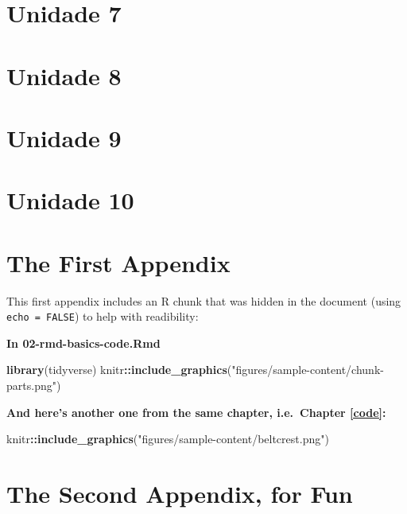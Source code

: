\documentclass[a4paper, twoside]{templates/ociamthesis}
\newenvironment{Shaded}{\begin{snugshade}}{\end{snugshade}}
\newcommand{\KeywordTok}[1]{\textcolor[rgb]{0.13,0.29,0.53}{\textbf{#1}}}
\newcommand{\NormalTok}[1]{#1}
\newcommand{\OperatorTok}[1]{\textcolor[rgb]{0.81,0.36,0.00}{\textbf{#1}}}
\newcommand{\StringTok}[1]{\textcolor[rgb]{0.31,0.60,0.02}{#1}}
\renewenvironment{Shaded}
{
  \vspace{10pt}%
  \begin{snugshade}%
}{%
  \end{snugshade}%
  \vspace{8pt}%
}
\newcommand*{\bibtitle}{Bibliografía}
\theoremstyle{definition}
\theoremstyle{definition}
\theoremstyle{definition}
\theoremstyle{definition}
\theoremstyle{remark}
\begin{document}
\hypertarget{unidade-7}{%
\chapter{Unidade 7}\label{unidade-7}}

\hypertarget{unidade-8}{%
\chapter{Unidade 8}\label{unidade-8}}

\hypertarget{unidade-9}{%
\chapter{Unidade 9}\label{unidade-9}}

\hypertarget{unidade-10}{%
\chapter{Unidade 10}\label{unidade-10}}

\startappendices

\hypertarget{the-first-appendix}{%
\chapter{The First Appendix}\label{the-first-appendix}}

This first appendix includes an R chunk that was hidden in the document (using \texttt{echo\ =\ FALSE}) to help with readibility:

\textbf{In 02-rmd-basics-code.Rmd}

\begin{Shaded}
\begin{Highlighting}[]
\KeywordTok{library}\NormalTok{(tidyverse)}
\NormalTok{knitr}\OperatorTok{::}\KeywordTok{include\_graphics}\NormalTok{(}\StringTok{"figures/sample{-}content/chunk{-}parts.png"}\NormalTok{)}
\end{Highlighting}
\end{Shaded}

\textbf{And here's another one from the same chapter, i.e.~Chapter \ref{code}:}

\begin{Shaded}
\begin{Highlighting}[]
\NormalTok{knitr}\OperatorTok{::}\KeywordTok{include\_graphics}\NormalTok{(}\StringTok{"figures/sample{-}content/beltcrest.png"}\NormalTok{)}
\end{Highlighting}
\end{Shaded}

\hypertarget{the-second-appendix-for-fun}{%
\chapter{The Second Appendix, for Fun}\label{the-second-appendix-for-fun}}


\setlength{\baselineskip}{0pt} %

{\renewcommand*\MakeUppercase[1]{#1}%
\printbibliography[heading=bibintoc,title={\bibtitle}]}
\end{document}
